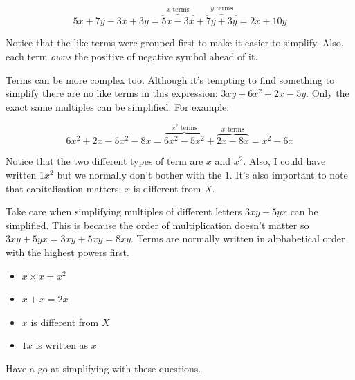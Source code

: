 \documentclass[
  a4paper,
]{scrbook}
\providecommand{\tightlist}{%
  \setlength{\itemsep}{0pt}\setlength{\parskip}{0pt}}\usepackage{longtable,booktabs,array}
\begin{document}
\[
5x + 7y - 3x + 3y = \overbrace{5x - 3x}^{x\text{ terms}} + \overbrace{7y + 3y}^{y\text{ terms}} = 2x + 10y
\]

Notice that the like terms were grouped first to make it easier to
simplify. Also, each term \emph{owns} the positive of negative symbol
ahead of it.

Terms can be more complex too. Although it's tempting to find something
to simplify there are no like terms in this expression:
\(3xy + 6x^2 + 2x - 5y\). Only the exact same multiples can be
simplified. For example:

\[
6x^2 + 2x - 5x^2 -8x = \overbrace{6x^2 -5x^2}^{x^2\text{ terms}} + \overbrace{2x-8x}^{x\text{ terms}}=x^2-6x
\]

Notice that the two different types of term are \(x\) and \(x^2\). Also,
I could have written \(1x^2\) but we normally don't bother with the
\(1\). It's also important to note that capitalisation matters; \(x\) is
different from \(X\).

Take care when simplifying multiples of different letters \(3xy + 5yx\)
can be simplified. This is because the order of multiplication doesn't
matter so \(3xy + 5yx = 3xy + 5xy = 8xy\). Terms are normally written in
alphabetical order with the highest powers first.

\begin{tcolorbox}[enhanced jigsaw, opacityback=0, left=2mm, toptitle=1mm, title=\textcolor{quarto-callout-note-color}{\faInfo}\hspace{0.5em}{Key point:}, breakable, colbacktitle=quarto-callout-note-color!10!white, opacitybacktitle=0.6, bottomtitle=1mm, arc=.35mm, colback=white, leftrule=.75mm, bottomrule=.15mm, colframe=quarto-callout-note-color-frame, rightrule=.15mm, titlerule=0mm, toprule=.15mm, coltitle=black]

\begin{itemize}
\tightlist
\item
  \(x \times x = x^2\)
\item
  \(x + x = 2x\)
\item
  \(x\) is different from \(X\)
\item
  \(1x\) is written as \(x\)
\end{itemize}

\end{tcolorbox}

Have a go at simplifying with these questions.
\end{document}
